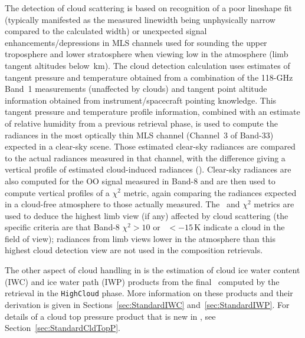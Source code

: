 The detection of cloud scattering is based on recognition of a poor lineshape fit (typically manifested as the measured linewidth being unphysically narrow compared to the calculated width) or unexpected signal enhancements/depressions in MLS channels used for sounding the upper troposphere and lower stratosphere when viewing low in the atmosphere (limb tangent altitudes below \,km).  The cloud detection calculation uses estimates of tangent pressure and temperature obtained from a combination of the \mbox{118-GHz} Band~1 measurements (unaffected by clouds) and tangent point altitude information obtained from instrument/spacecraft pointing knowledge. This tangent pressure and temperature profile information, combined with an estimate of relative humidity from a previous retrieval phase, is used to compute the radiances in the most optically thin MLS channel (\mbox{Channel~3} of \mbox{Band-33}) expected in a clear-sky scene.  Those estimated clear-sky radiances are compared to the actual radiances measured in that channel, with the difference giving a vertical profile of estimated cloud-induced radiances (\Tcir).  Clear-sky radiances are also computed for the OO signal measured in \mbox{Band-8} and are then used to compute vertical profiles of a $\chi^2$ metric, again comparing the radiances expected in a cloud-free atmosphere to those actually measured. The \Tcir\ and $\chi^2$ metrics are used to deduce the highest limb view (if any) affected by cloud scattering (the specific criteria are that \mbox{Band-8} $\chi^2 > 10$ or \Tcir\ $< -15$\,K indicate a cloud in the field of view); radiances from limb views lower in the atmosphere than this highest cloud detection view are not used in the composition retrievals.

The other aspect of cloud handling in \thisv is the estimation of cloud ice water content (IWC) and ice water path (IWP) products from the final \Tcir\ computed by the retrieval in the \texttt{HighCloud} phase. More information on these products and their derivation is given in Sections~\ref{sec:StandardIWC} and~\ref{sec:StandardIWP}.  For details of a cloud top pressure product that is new in \thisv, see Section~\ref{sec:StandardCldTopP}.

